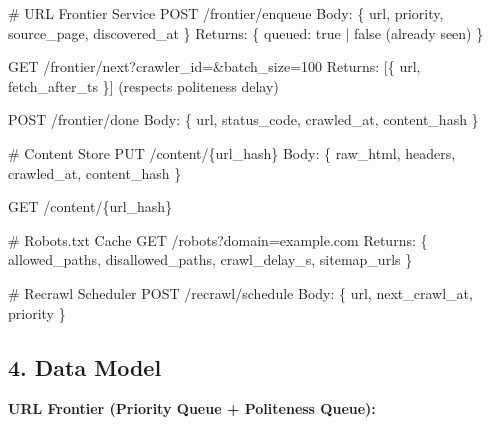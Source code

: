 \documentclass[11pt]{article}
\newenvironment{Shaded}{\begin{snugshade}}{\end{snugshade}}
\newcommand{\BuiltInTok}[1]{\textcolor[rgb]{0.50,0.55,0.55}{#1}}
\newcommand{\CommentTok}[1]{\textcolor[rgb]{0.48,0.49,0.49}{#1}}
\newcommand{\DecValTok}[1]{\textcolor[rgb]{0.96,0.45,0.00}{#1}}
\newcommand{\NormalTok}[1]{\textcolor[rgb]{0.81,0.81,0.76}{#1}}
\newcommand{\OperatorTok}[1]{\textcolor[rgb]{0.81,0.81,0.76}{#1}}
\begin{document}
\begin{Shaded}
\begin{Highlighting}[]
\CommentTok{\# URL Frontier Service}
\NormalTok{POST   }\OperatorTok{/}\NormalTok{frontier}\OperatorTok{/}\NormalTok{enqueue}
\NormalTok{       Body: \{ url, priority, source\_page, discovered\_at \}}
\NormalTok{       Returns: \{ queued: true }\OperatorTok{|}\NormalTok{ false (already seen) \}}

\NormalTok{GET    }\OperatorTok{/}\NormalTok{frontier}\OperatorTok{/}\BuiltInTok{next}\NormalTok{?crawler\_id}\OperatorTok{=\&}\NormalTok{batch\_size}\OperatorTok{=}\DecValTok{100}
\NormalTok{       Returns: [\{ url, fetch\_after\_ts \}]  (respects politeness delay)}

\NormalTok{POST   }\OperatorTok{/}\NormalTok{frontier}\OperatorTok{/}\NormalTok{done}
\NormalTok{       Body: \{ url, status\_code, crawled\_at, content\_hash \}}

\CommentTok{\# Content Store}
\NormalTok{PUT    }\OperatorTok{/}\NormalTok{content}\OperatorTok{/}\NormalTok{\{url\_hash\}}
\NormalTok{       Body: \{ raw\_html, headers, crawled\_at, content\_hash \}}

\NormalTok{GET    }\OperatorTok{/}\NormalTok{content}\OperatorTok{/}\NormalTok{\{url\_hash\}}

\CommentTok{\# Robots.txt Cache}
\NormalTok{GET    }\OperatorTok{/}\NormalTok{robots?domain}\OperatorTok{=}\NormalTok{example.com}
\NormalTok{       Returns: \{ allowed\_paths, disallowed\_paths, crawl\_delay\_s, sitemap\_urls \}}

\CommentTok{\# Recrawl Scheduler}
\NormalTok{POST   }\OperatorTok{/}\NormalTok{recrawl}\OperatorTok{/}\NormalTok{schedule}
\NormalTok{       Body: \{ url, next\_crawl\_at, priority \}}
\end{Highlighting}
\end{Shaded}

\subsection{4. Data Model}\label{4-data-model-3}

\textbf{URL Frontier (Priority Queue + Politeness Queue):}

\end{document}

